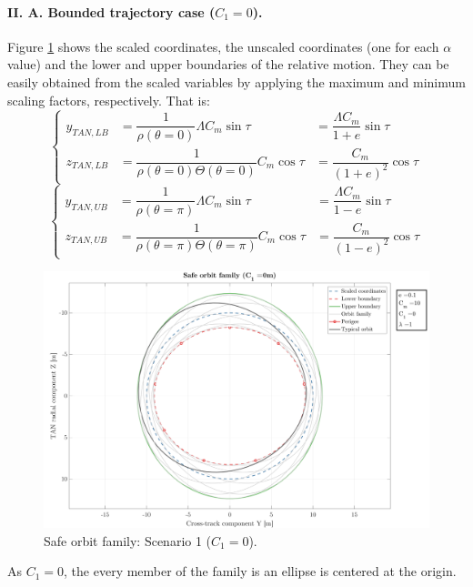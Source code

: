 		\paragraph{\textcolor{GMVred}{II. A.} Bounded trajectory case ($C_1 = 0$). \\}
		\indent Figure \ref{figCh3:Safe_orbit_1} shows the scaled coordinates, the unscaled coordinates (one for each $\alpha$ value) and the lower and upper boundaries of the relative motion. They can be easily obtained from the scaled variables by applying the maximum and minimum scaling factors, respectively. That is:
		\begin{equation}
		\left\{ \begin{array}{llll}
		y_{TAN, LB}  & = \dfrac{1}{\rho(\theta = 0)} \Lambda C_m \sin\tau  &= \dfrac{\Lambda C_m }{1 + e} \sin\tau \\[1.3em]
		z_{TAN, LB}  & = \dfrac{1}{\rho(\theta = 0) \Theta(\theta = 0)} C_m \cos\tau  &= \dfrac{ C_m }{(1 + e)^2} \cos\tau 
		\end{array} \right.
		\label{eqCh3:LB}
		\end{equation}
		\begin{equation}
		\left\{ \begin{array}{llll}
		y_{TAN, UB}  & = \dfrac{1}{\rho(\theta = \pi)} \Lambda C_m \sin\tau  &= \dfrac{\Lambda C_m }{1 - e} \sin\tau \\[1.3em]
		z_{TAN, UB}  & = \dfrac{1}{\rho(\theta = \pi) \Theta(\theta = \pi)} C_m \cos\tau  &= \dfrac{ C_m }{(1 - e)^2} \cos\tau 
		\end{array} \right.
		\label{eqCh3:UB}
		\end{equation}
		\begin{figure}[!htb]
		\centering\includegraphics[width = 0.7\linewidth]{Chapters/Chapter_03/Safe_orbit_C1_0}
		\caption{Safe orbit family: Scenario 1 ($C_1 = 0$).}
		\label{figCh3:Safe_orbit_1}
		\end{figure}
		\FloatBarrier
		\indent As $C_1 = 0$, the every member of the family is an ellipse is centered at the origin.
